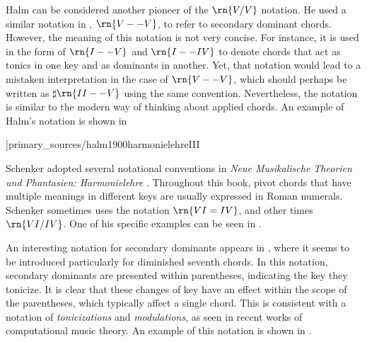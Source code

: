 Halm can be considered another pioneer of the $\rn{V/V}$
notation. He used a similar notation in
\textcite{halm1900harmonielehre}, $\rn{V--V}$, to refer to
secondary dominant chords. However, the meaning of this
notation is not very concise. For instance, it is used in
the form of $\rn{I--V}$ and $\rn{I--IV}$ to denote chords
that act as tonics in one key and as dominants in another.
Yet, that notation would lead to a mistaken interpretation
in the case of $\rn{V--V}$, which should perhaps be written
as $\sharp{}\rn{II--V}$ using the same convention.
Nevertheless, the notation is similar to the modern way of
thinking about applied chords. An example of Halm's notation
is shown in

\phdfigure[Notation for secondary dominants in
 \textcite[p.~III]{halm1900harmonielehre}]{primary_sources/halm1900harmonielehreIII}

Schenker adopted several notational conventions in
\emph{Neue Musikalische Theorien und Phantasien:
Harmonielehre} \parencite{schenker1906neue}. Throughout this
book, pivot chords that have multiple meanings in different
keys are usually expressed in Roman numerals. Schenker
sometimes uses the notation $\rn{VI=IV}$, and other times
$\rn{VI/IV}$. One of his specific examples can be seen in
.




An interesting notation for secondary dominants appears in
\textcite{white1911harmonic}, where it seems to be
introduced particularly for diminished seventh chords. In
this notation, secondary dominants are presented within
parentheses, indicating the key they tonicize. It is clear
that these changes of key have an effect within the scope of
the parentheses, which typically affect a single chord. This
is consistent with a notation of \emph{tonicizations} and
\emph{modulations}, as seen in recent works of computational
music theory. An example of this notation is shown in
.

